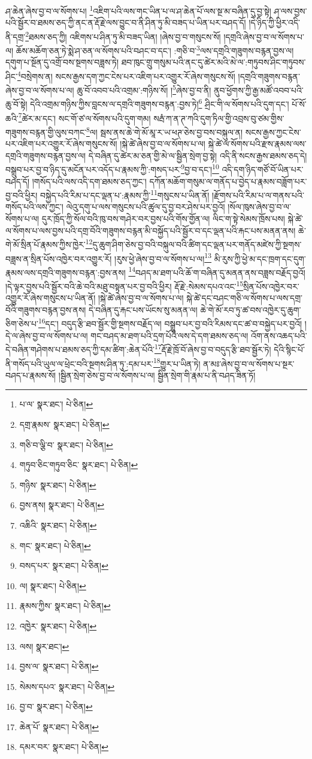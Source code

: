 ཤ་ཆེན་ཞེས་བྱ་བ་ལ་སོགས་པ། \footnote{པ་ལ་  སྣར་ཐང་།  པེ་ཅིན། }འཇིག་པའི་ལས་གང་ཡིན་པ་ལ་ཤ་ཆེན་པོ་ལས་སྔ་མ་བཞིན་དུ་བྱ་སྟེ། ཤ་ལས་བྱས་པའི་སྦྱོར་བ་ཐམས་ཅད་ཀྱི་ནང་ན་རྡོ་རྗེ་ལས་བྱུང་བ་ནི་ཤིན་ཏུ་མི་བཟད་པ་ཡིན་པར་བཤད་དོ། །དེ་ཉིད་ཀྱི་ཕྱིར་འདི་ནི་དགྲ་\footnote{དགྲ་རྣམས་  སྣར་ཐང་།  པེ་ཅིན། }ཐམས་ཅད་ཀྱི། འཇིགས་པ་ཤིན་ཏུ་མི་བཟད་ཡིན། །ཞེས་བྱ་བ་གསུངས་སོ། །དགྲའི་ཞེས་བྱ་བ་ལ་སོགས་པ་ལ། ཆོས་མཆོག་ཅན་ཏེ་སྨེ་ཤ་ཅན་ལ་སོགས་པའི་བཤང་བ་དང་། :གཅི་བ་\footnote{གཅི་བ་ལྕི་བ་  སྣར་ཐང་།  པེ་ཅིན། }ལས་དགྲའི་གཟུགས་བརྙན་བྱས་ལ། དགུག་པ་སྔོན་དུ་འགྲོ་བས་སྔགས་བཟླས་ཏེ། ཐབ་ཁུང་གྲུ་གསུམ་པའི་ནང་དུ་ཚེར་མའི་མེ་ལ་:གཏུབས་ཤིང་གཏུབས་ཤིང་\footnote{གཏུབ་ཅིང་གཏུབ་ཅིང་  སྣར་ཐང་།  པེ་ཅིན། }བསྲེགས་ན། སངས་རྒྱས་དག་ཀྱང་ངེས་པར་འཇིག་པར་འགྱུར་རོ་ཞེས་གསུངས་སོ། །དགྲའི་གཟུགས་བརྙན་ཞེས་བྱ་བ་ལ་སོགས་པ་ལ། ཆུ་བོ་འབབ་པའི་འགྲམ་:གཉིས་སོ། །\footnote{གཉིས་  སྣར་ཐང་།  པེ་ཅིན། }ཞེས་བྱ་བ་ནི། ནུབ་ཕྱོགས་ཀྱི་རྒྱ་མཚོ་འབབ་པའི་ཆུ་བོ་སྟེ། དེའི་འགྲམ་གཉིས་ཀྱིས་བླངས་ལ་དགྲའི་གཟུགས་བརྙན་:བྱས་ཏེ།\footnote{བྱས་ནས།  སྣར་ཐང་།  པེ་ཅིན། } ཤྲིང་གི་ལ་སོགས་པའི་དུག་དང་། པོ་སོ་ཆའི་\footnote{འཆིའི་  སྣར་ཐང་།  པེ་ཅིན། }ཚེར་མ་དང་། སང་གོ་ཙ་ལ་སོགས་པའི་དུག་གམ། སརྦཾ་ཀ་ན་ཊ་ཀའི་དུག་ཏིལ་གྱི་འབྲས་བུ་ཙམ་གྱིས་གཟུགས་བརྙན་གྱི་ལུས་བཀང་\footnote{གང་  སྣར་ཐང་།  པེ་ཅིན། }ལ། སྦས་ནས་ཆེ་གེ་མོ་མཱ་ར་ཡ་ཕཊ་ཅེས་བྱ་བས་བསྐུལ་ན། སངས་རྒྱས་ཀྱང་ངེས་པར་འཇིག་པར་འགྱུར་རོ་ཞེས་གསུངས་སོ། །སྐེ་ཚེ་ཞེས་བྱ་བ་ལ་སོགས་པ་ལ། སྐེ་ཚེ་ལ་སོགས་པའི་རྫས་རྣམས་ལས་དགྲའི་གཟུགས་བརྙན་བྱས་ལ། དེ་བཞིན་དུ་ཚེར་མ་ཅན་གྱི་མེ་ལ་སྦྱིན་སྲེག་བྱ་སྟེ། འདི་ནི་སངས་རྒྱས་ཐམས་ཅད་དེ། བསྒྲུབ་པར་བྱ་བ་ཉིད་དུ་མངོན་པར་འདོད་པ་རྣམས་ཀྱི་:གསད་པར་\footnote{བསད་པར་  སྣར་ཐང་།  པེ་ཅིན། }བྱ་བ་དང་།\footnote{ལ།  སྣར་ཐང་།  པེ་ཅིན། } འདི་དག་ཉིད་གཙོ་བོ་ཡིན་པར་བཤད་དོ། །གསོད་པའི་ལས་འདི་དག་ཐམས་ཅད་ཀྱང་། དཀོན་མཆོག་གསུམ་ལ་གནོད་པ་བྱེད་པ་རྣམས་བཟློག་པར་བྱ་བའི་ཕྱིར། བསྐྱེད་པའི་རིམ་པ་དང་ལྡན་པ་:རྣམས་ཀྱི་\footnote{རྣམས་ཀྱིས་  སྣར་ཐང་།  པེ་ཅིན། }གསུངས་པ་ཡིན་ནོ། །རྫོགས་པའི་རིམ་པ་ལ་གནས་པའི་གསོད་པའི་ལས་ཀྱང་། ལེའུ་དགུ་པ་ལས་གསུངས་པའི་ཚུལ་དུ་བྱ་བར་ཤེས་པར་བྱའོ། །སོལ་ཁུས་ཞེས་བྱ་བ་ལ་སོགས་པ་ལ། དུར་ཁྲོད་ཀྱི་སོལ་བའི་ཁུ་བས་གཤེར་བར་བྱས་པའི་གོས་གྱོན་ལ། ལིང་ག་སྟེ་སེམས་ཁྲོས་པས། སྐེ་ཚེ་ལ་སོགས་པ་ལས་བྱས་པའི་དགྲ་བོའི་གཟུགས་བརྙན་མི་བསྐྱོད་པའི་སྦྱོར་བ་དང་ལྡན་པའི་རྐང་པས་མནན་ནས། ཆེ་གེ་མོ་སྲིན་པོ་རྣམས་ཀྱིས་ཁྱེར་\footnote{འཁྱེར་  སྣར་ཐང་།  པེ་ཅིན། }དུ་ཆུག་ཤིག་ཅེས་བྱ་བའི་བསྐུལ་བའི་ཚིག་དང་ལྡན་པར་གནོད་མཛེས་ཀྱི་སྔགས་བཟླས་ན་སྲིན་པོས་འཁྱེར་བར་འགྱུར་རོ། །རུས་ཕྱེ་ཞེས་བྱ་བ་ལ་སོགས་པ་ལ།\footnote{ལས།  སྣར་ཐང་། } མི་རུས་ཀྱི་ཕྱེ་མ་དང་ཁྲག་དང་དུག་རྣམས་ལས་དགྲའི་གཟུགས་བརྙན་:བྱས་ནས། \footnote{བྱས་ལ་  སྣར་ཐང་།  པེ་ཅིན། }བཤད་མ་ཐག་པའི་ཆོ་ག་བཞིན་དུ་མནན་ནས་བཟླས་བརྗོད་བྱའོ། །དེ་ལྟར་བྱས་པའི་སྦྱོར་བའི་ཆེ་བའི་མཐུ་བསྟན་པར་བྱ་བའི་ཕྱིར། རྡོ་རྗེ་:སེམས་དཔའ་འང་\footnote{སེམས་དཔའ་  སྣར་ཐང་།  པེ་ཅིན། }སྲིན་པོས་འཁྱེར་བར་འགྱུར་རོ་ཞེས་གསུངས་པ་ཡིན་ནོ། །སྐེ་ཚེ་ཞེས་བྱ་བ་ལ་སོགས་པ་ལ། སྐེ་ཚེ་དང་བཤང་གཅི་ལ་སོགས་པ་ལས་དགྲ་བོའི་གཟུགས་བརྙན་བྱས་ནས། དེ་བཞིན་དུ་རྐང་པས་ཡོངས་སུ་མནན་ལ། ཆེ་གེ་མོ་རབ་ཏུ་ཚ་བས་འཁྱེར་དུ་ཆུག་ཅིག་ཅེས་པ་\footnote{བྱ་བ་  སྣར་ཐང་།  པེ་ཅིན། }དང་། བདུད་རྩི་ཐབ་སྦྱོར་གྱི་སྔགས་བརྗོད་ལ། བསྒྲུབ་པར་བྱ་བའི་རིམས་དང་ཚ་བ་བསྐྱེད་པར་བྱའོ། །དེ་ལ་ཞེས་བྱ་བ་ལ་སོགས་པ་ལ། གང་བཤད་མ་ཐག་པའི་དྲག་པོའི་ལས་དེ་དག་ཐམས་ཅད་ལ། འོག་ནས་འཆད་པའི་དེ་བཞིན་གཤེགས་པ་ཐམས་ཅད་ཀྱི་དམ་ཚིག་:ཆེན་པོའི་\footnote{ཆེན་པོ་  སྣར་ཐང་།  པེ་ཅིན། }རྡོ་རྗེ་ཁྲོ་བོ་ཞེས་བྱ་བ་བདུད་རྩི་ཐབ་སྦྱོར་ཏེ། དེའི་སྙིང་པོ་ནི་གསོད་པའི་ཡུལ་ལ་ཕྲེང་བའི་སྔགས་ཤིན་ཏུ་:དམ་པར་\footnote{དམར་བར་  སྣར་ཐང་།  པེ་ཅིན། }གྱུར་པ་ཡིན་ཏེ། ན་མཿ་ཞེས་བྱ་བ་ལ་སོགས་པ་སྔར་བཤད་པ་རྣམས་སོ། །སྦྱིན་སྲེག་ཅེས་བྱ་བ་ལ་སོགས་པ་ལ། སྦྱིན་སྲེག་གི་རྣམ་པ་ནི་བཤད་ཟིན་ཏོ། 